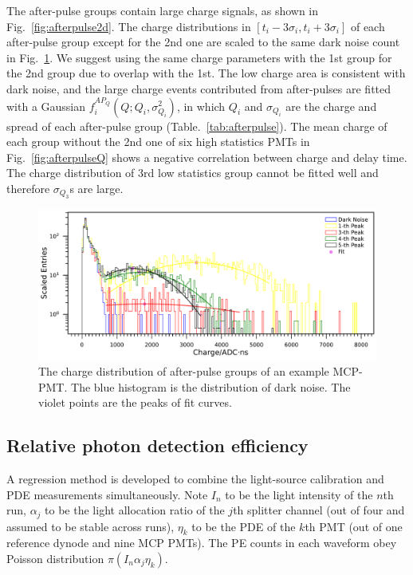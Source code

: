 The after-pulse groups contain large charge signals, as shown in Fig.~\ref{fig:afterpulse2d}. The charge distributions in $[t_i-3\sigma_i,t_i+3\sigma_i]$ of each after-pulse group except for the 2nd one are scaled to the same dark noise count in Fig.~\ref{fig:afterpulsecharge}. We suggest using the same charge parameters with the 1st group for the 2nd group due to overlap with the 1st. The low charge area is consistent with dark noise, and the large charge events contributed from after-pulses are fitted with a Gaussian $f^{AP_Q}_i(Q;Q_i,\sigma_{Q_i}^2)$, in which $Q_i$ and $\sigma_{Q_i}$ are the charge and spread of each after-pulse group (Table.~\ref{tab:afterpulse}). The mean charge of each group without the 2nd one of six high statistics PMTs in Fig.~\ref{fig:afterpulseQ} shows a negative correlation between charge and delay time. The charge distribution of 3rd low statistics group cannot be fitted well and therefore $\sigma_{Q_3}$s are large. 

\begin{figure}[!htbp]
    \centering
    \includegraphics[width=\textwidth]{figures/method/triggerafterpulseCharge.pdf}
    \caption{The charge distribution of after-pulse groups of an example MCP-PMT. The blue histogram is the distribution of dark noise. The violet points are the peaks of fit curves.}
    \label{fig:afterpulsecharge}
\end{figure}

\subsection{Relative photon detection efficiency}
\label{sec:PDE}
A regression method is developed to combine the light-source calibration and PDE measurements simultaneously. Note $I_n$ to be the light intensity of the $n$th run, $\alpha_j$ to be the light allocation ratio of the $j$th splitter channel (out of four and assumed to be stable across runs), $\eta_k$ to be the PDE of the $k$th PMT (out of one reference dynode and nine MCP PMTs). The PE counts in each waveform obey Poisson distribution $\pi(I_n\alpha_j\eta_k)$.

